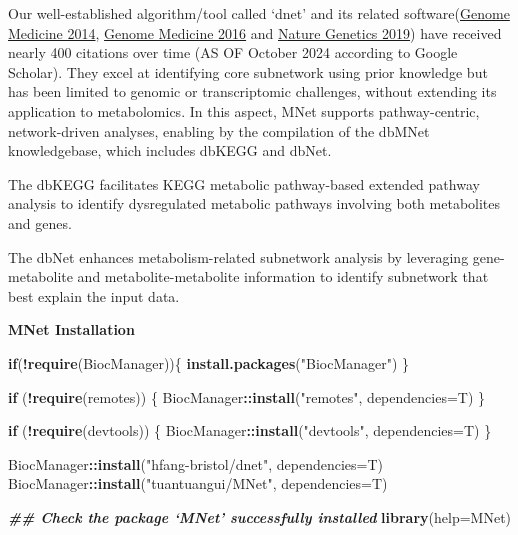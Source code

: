 \documentclass[
]{book}
\newenvironment{Shaded}{\begin{snugshade}}{\end{snugshade}}
\newcommand{\AttributeTok}[1]{\textcolor[rgb]{0.13,0.29,0.53}{#1}}
\newcommand{\ControlFlowTok}[1]{\textcolor[rgb]{0.13,0.29,0.53}{\textbf{#1}}}
\newcommand{\DocumentationTok}[1]{\textcolor[rgb]{0.56,0.35,0.01}{\textbf{\textit{#1}}}}
\newcommand{\FunctionTok}[1]{\textcolor[rgb]{0.13,0.29,0.53}{\textbf{#1}}}
\newcommand{\NormalTok}[1]{#1}
\newcommand{\SpecialCharTok}[1]{\textcolor[rgb]{0.81,0.36,0.00}{\textbf{#1}}}
\newcommand{\StringTok}[1]{\textcolor[rgb]{0.31,0.60,0.02}{#1}}
\begin{document}
Our well-established algorithm/tool called `dnet' and its related software(\href{https://doi.org/10.1186/s13073-014-0064-8}{Genome Medicine 2014}, \href{https://doi.org/10.1186/s13073-016-0384-y}{Genome Medicine 2016} and \href{https://doi.org/10.1038/s41588-019-0456-1}{Nature Genetics 2019}) have received nearly 400 citations over time (AS OF October 2024 according to Google Scholar). They excel at identifying core subnetwork using prior knowledge but has been limited to genomic or transcriptomic challenges, without extending its application to metabolomics. In this aspect, MNet supports pathway-centric, network-driven analyses, enabling by the compilation of the dbMNet knowledgebase, which includes dbKEGG and dbNet.

The dbKEGG facilitates KEGG metabolic pathway-based extended pathway analysis to identify dysregulated metabolic pathways involving both metabolites and genes.

The dbNet enhances metabolism-related subnetwork analysis by leveraging gene-metabolite and metabolite-metabolite information to identify subnetwork that best explain the input data.

\textbf{MNet Installation}

\begin{Shaded}
\begin{Highlighting}[]
\ControlFlowTok{if}\NormalTok{(}\SpecialCharTok{!}\FunctionTok{require}\NormalTok{(BiocManager))\{}
  \FunctionTok{install.packages}\NormalTok{(}\StringTok{"BiocManager"}\NormalTok{)}
\NormalTok{\}}

\ControlFlowTok{if}\NormalTok{ (}\SpecialCharTok{!}\FunctionTok{require}\NormalTok{(remotes)) \{}
\NormalTok{  BiocManager}\SpecialCharTok{::}\FunctionTok{install}\NormalTok{(}\StringTok{"remotes"}\NormalTok{, }\AttributeTok{dependencies=}\NormalTok{T)}
\NormalTok{\}}

\ControlFlowTok{if}\NormalTok{ (}\SpecialCharTok{!}\FunctionTok{require}\NormalTok{(devtools)) \{}
\NormalTok{  BiocManager}\SpecialCharTok{::}\FunctionTok{install}\NormalTok{(}\StringTok{"devtools"}\NormalTok{, }\AttributeTok{dependencies=}\NormalTok{T)}
\NormalTok{\}}

\NormalTok{BiocManager}\SpecialCharTok{::}\FunctionTok{install}\NormalTok{(}\StringTok{"hfang{-}bristol/dnet"}\NormalTok{, }\AttributeTok{dependencies=}\NormalTok{T)}
\NormalTok{BiocManager}\SpecialCharTok{::}\FunctionTok{install}\NormalTok{(}\StringTok{"tuantuangui/MNet"}\NormalTok{, }\AttributeTok{dependencies=}\NormalTok{T)}

\DocumentationTok{\#\# Check the package ‘MNet’ successfully installed}
\FunctionTok{library}\NormalTok{(}\AttributeTok{help=}\NormalTok{MNet)}
\end{Highlighting}
\end{Shaded}
\end{document}
